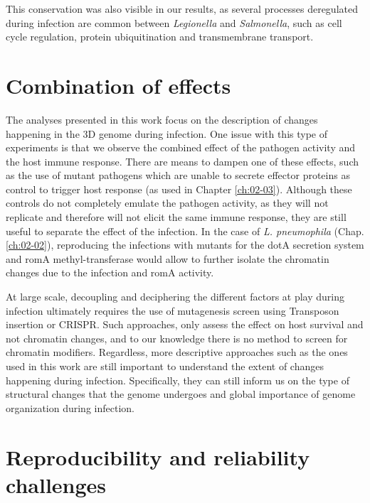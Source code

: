 This conservation was also visible in our results, as several processes deregulated during infection are common between \textit{Legionella} and \textit{Salmonella}, such as cell cycle regulation, protein ubiquitination and transmembrane transport.


\section{Combination of effects}

The analyses presented in this work focus on the description of changes happening in the 3D genome during infection. One issue with this type of experiments is that we observe the combined effect of the pathogen activity and the host immune response. There are means to dampen one of these effects, such as the use of mutant pathogens which are unable to secrete effector proteins as control to trigger host response (as used in Chapter \ref{ch:02-03}). Although these controls do not completely emulate the pathogen activity, as they will not replicate  \cite{vogelConjugativeTransferVirulence1998} and therefore will not elicit the same immune response, they are still useful to separate the effect of the infection. In the case of \textit{L. pneumophila} (Chap. \ref{ch:02-02}), reproducing the infections with mutants for the dotA secretion system and romA methyl-transferase would allow to further isolate the chromatin changes due to the infection and romA activity.

At large scale, decoupling and deciphering the different factors at play during infection ultimately requires the use of mutagenesis screen using Transposon insertion or CRISPR. Such approaches, only assess the effect on host survival and not chromatin changes, and to our knowledge there is no method to screen for chromatin modifiers. Regardless, more descriptive approaches such as the ones used in this work are still important to understand the extent of changes happening during infection. Specifically, they can still inform us on the type of structural changes that the genome undergoes and global importance of genome organization during infection.


\section{Reproducibility and reliability challenges}

